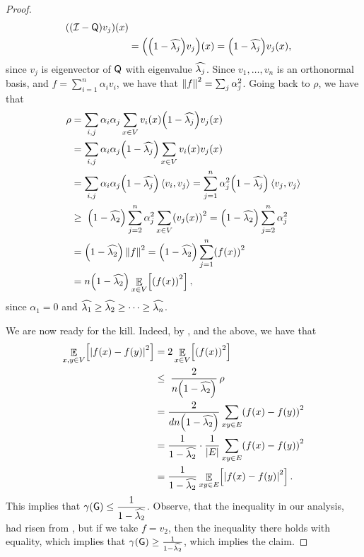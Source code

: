 \begin{proof}
\begin{align*}
        \pth{\MakeBig
           \pth{\IMtrx - \TMtrx} v_j} ({x})
        \\&=%
        \pth{
           \pth{1- \TEV{j}} v_j}(x) =      
           \pth{1- \TEV{j}} v_j(x),
    \end{align*}
    since $v_j$ is eigenvector of $\mathsf{Q}$ with eigenvalue $\widehat{\lambda_{j}}$.
    Since $v_1,\ldots, v_n$ is an orthonormal basis, and
    $f=\sum_{i=1}^n \alpha_i v_i$, we have that $\left\| {f} \right\|^2 = \sum_j
    \alpha_j^2$.  Going back to $\rho$, we have that
    \begin{align}
        \nonumber \rho &= \sum_{i,j} \alpha_i \alpha_j \sum_{x \in V} v_i(x)
        \pth{1- \TEV{j}} v_j(x)
        \\ \nonumber
        &=%
        \sum_{i,j} \alpha_i \alpha_j \pth{1- \TEV{j}}
        \sum_{x \in V} v_i(x) v_j(x)\\
        &= \sum_{i,j} \alpha_i \alpha_j \pth{1- \TEV{j}}
        \DotProd{v_i}{v_j} = \sum_{j=1}^n \alpha_j^2 \pth{1- \TEV{j}}
        \DotProd{v_j}{v_j}%
        \nonumber \\%
        \eqlab{inequality:tension} &\geq \; \pth{1-
           \TEV{2}} \sum_{j=2}^n \alpha_j^2 \sum_{x \in V}
        \pth{v_j(x)}^2 =
        \pth{1-
           \TEV{2}} \sum_{j=2}^n \alpha_j^2
        \nonumber \\
        &= \pth{1-
           \TEV{2}} \norm{f}^2= \pth{1-
           \TEV{2}} \sum_{j=1}^n \pth{f(x) }^2\\
        &= n\pth{1- \TEV{2}} \ExExt{x \in
           V}{\pth[]{f(x)}^2}, \nonumber
    \end{align}
    since $\alpha_1 = 0$ and $\widehat{\lambda_{1}} \geq
    \widehat{\lambda_{2}} \geq \cdots \geq \widehat{\lambda_{n}}$.

    We are now ready for the kill. Indeed, by , and
    the above, we have that
    \begin{align*}
        \ExExt{x,y \in V}{\cardin{f(x)- f(y)}^2} &=2 \ExExt{x \in
           V}{\pth[]{f(x)}^2}
        \\
        &\leq \; \frac{2}{n\pth[]{1-
              \TEV{2}}} \, \rho
        \\
        &= \frac{2}{dn\pth[]{1-
              \TEV{2}}}  \sum_{xy \in E}\pth{ f(x) -f(y) }^2\\
        &= \frac{1}{1- \TEV{2}} \cdot \frac{1}{\cardin{E}}
        \sum_{xy \in E}\pth{ f(x) -f(y) }^2
        \\
        &= \frac{1}{1-
           \TEV{2}} \ExExt{ xy \in E}{\cardin{f(x)-
              f(y)}^2}.
    \end{align*}
    This implies that $\ds \DialX{\Graph} \leq \frac{1}{1-
       \TEV{2}}$. Observe, that the inequality in our analysis, had
    risen from , but if we take $f= v_2$,
    then the inequality there holds with equality, which implies that
    $\DialX{\Graph} \geq \frac{1}{1- \TEV{2}}$, which implies the
    claim.
\end{proof}

